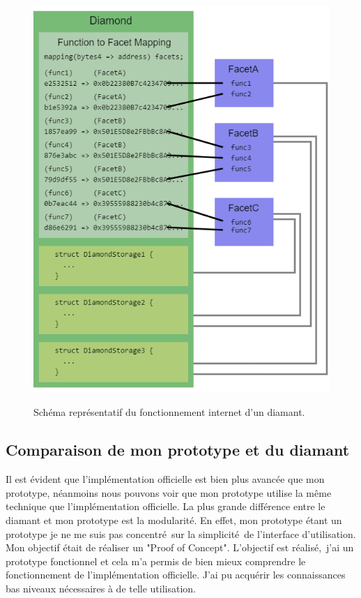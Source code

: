 \begin{figure}[h]
  \caption{Schéma représentatif du fonctionnement internet d'un diamant.}
  \includegraphics[scale=0.5]{diamond_struct.png}
  \centering 
  \label{fig:diamond_struct}
\end{figure}



\subsection{Comparaison de mon prototype et du diamant}

Il est évident que l'implémentation officielle est bien plus avancée que mon prototype,
néanmoins nous pouvons voir que mon prototype utilise la même technique que l'implémentation officielle.
La plus grande différence entre le diamant et mon prototype est la modularité. En effet, mon prototype étant
un prototype je ne me suis pas concentré sur la simplicité de l'interface d'utilisation. Mon objectif était 
de réaliser un "Proof of Concept". L'objectif est réalisé, j'ai un prototype fonctionnel et cela m'a permis 
de bien mieux comprendre le fonctionnement de l'implémentation officielle. J'ai pu acquérir les connaissances
bas niveaux nécessaires à de telle utilisation.
